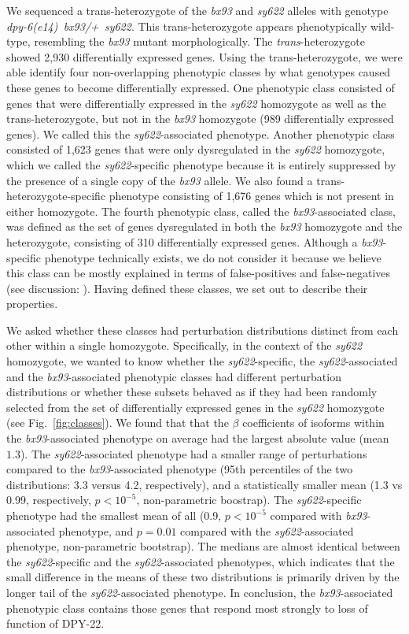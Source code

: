 \documentclass[10pt, onecolumn]{article}
\newcommand{\gene}[1]{\mbox{\emph{#1}}}
\newcommand{\protein}[1]{\mbox{\uppercase{#1}}}
\newcommand{\transn}{2,930}
\begin{document}
We sequenced a trans-heterozygote of the \emph{bx93} and \emph{sy622} alleles
with genotype \gene{dpy-6(e14) bx93/+ sy622}. This trans-heterozygote appears
phenotypically wild-type, resembling the \emph{bx93} mutant morphologically. The
\emph{trans}-heterozygote showed \transn{} differentially expressed genes. Using
the trans-heterozygote, we were able identify four non-overlapping phenotypic
classes by what genotypes caused these genes to become
differentially expressed. One phenotypic class consisted of genes that were
differentially expressed in the \emph{sy622} homozygote as well as the
trans-heterozygote, but not in the \emph{bx93} homozygote (989 differentially
expressed genes). We called this the \emph{sy622}-associated phenotype. Another
phenotypic class consisted of 1,623 genes that were only dysregulated in the
\emph{sy622} homozygote, which we called the \emph{sy622}-specific phenotype
because it is entirely suppressed by the presence of a single copy of the
\emph{bx93} allele. We also found a trans-heterozygote-specific phenotype
consisting of 1,676 genes which is not present in either homozygote. The fourth
phenotypic class, called the \emph{bx93}-associated class, was defined as the
set of genes dysregulated in both the \emph{bx93} homozygote and the
heterozygote, consisting of 310 differentially expressed genes. Although a
\emph{bx93}-specific phenotype technically exists, we do not consider it because
we believe this class can be mostly explained in terms of false-positives and
false-negatives (see discussion: ). Having defined
these classes, we set out to describe their properties.

We asked whether these classes had perturbation distributions distinct from each
other within a single homozygote. Specifically, in the context of the
\emph{sy622} homozygote, we wanted to know whether the \emph{sy622}-specific,
the \emph{sy622}-associated and the \emph{bx93}-associated phenotypic classes had
different perturbation distributions or whether these subsets
behaved as if they had been randomly selected from the set of differentially
expressed genes in the \emph{sy622} homozygote (see Fig.~\ref{fig:classes}). We
found that that the $\beta$ coefficients of isoforms within the
\emph{bx93}-associated phenotype on average had the largest absolute value (mean
$1.3$). The \emph{sy622}-associated phenotype had a smaller range of
perturbations compared to the \emph{bx93}-associated phenotype (95th percentiles
of the two distributions: 3.3 versus 4.2, respectively), and a statistically
smaller mean (1.3 vs 0.99, respectively, $p < 10^{-5}$, non-parametric
boostrap). The \emph{sy622}-specific phenotype had the smallest mean of all
(0.9, $p < 10^{-5}$ compared with \emph{bx93}-associated phenotype, and $p =
0.01$ compared with the \emph{sy622}-associated phenotype, non-parametric
bootstrap). The medians are almost identical between the \emph{sy622}-specific
and the \emph{sy622}-associated phenotypes, which indicates that the small
difference in the means of these two distributions is primarily driven by the
longer tail of the \emph{sy622}-associated phenotype. In conclusion, the
\emph{bx93}-associated phenotypic class contains those genes that respond most
strongly to loss of function of \protein{dpy-22}.
\end{document}
